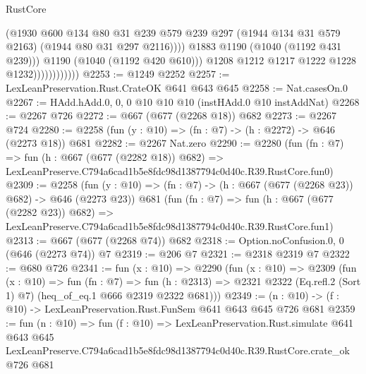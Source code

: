 \begin{lexlean}{RustCore}
\begin{coremodule}
                                    (@1930
                                      @600
                                      @134
                                      @80
                                      @31
                                      @239
                                      @579
                                      @239
                                      @297
                                      (@1944 @134 @31 @579 @2163)
                                      (@1944 @80 @31 @297 @2116))))
                                @1883
                                @1190
                                (@1040 (@1192 @431 @239)))
                              @1190
                              (@1040 (@1192 @420 @610)))
                            @1208
                            @1212
                            @1217
                            @1222
                            @1228
                            @1232))))))))))))
@2253 := @1249 @2252
@2257 := LexLeanPreservation.Rust.CrateOK @641 @643 @645
@2258 := Nat.casesOn.{0}
@2267 := HAdd.hAdd.{0, 0, 0} @10 @10 @10 (instHAdd.{0} @10 instAddNat)
@2268 := @2267 @726
@2272 := @667 (@677 (@2268 @18)) @682
@2273 := @2267 @724
@2280 := @2258 (fun (y : @10) => (fn : @7) -> (h : @2272) -> @646 (@2273 @18)) @681
@2282 := @2267 Nat.zero
@2290 := @2280
    (fun (fn : @7) =>
    fun (h : @667 (@677 (@2282 @18)) @682) =>
    LexLeanPreserve.C794a6cad1b5e8fdc98d1387794c0d40c.R39.RustCore.fun0)
@2309 := @2258
    (fun (y : @10) => (fn : @7) -> (h : @667 (@677 (@2268 @23)) @682) -> @646 (@2273 @23))
    @681
    (fun (fn : @7) =>
    fun (h : @667 (@677 (@2282 @23)) @682) =>
    LexLeanPreserve.C794a6cad1b5e8fdc98d1387794c0d40c.R39.RustCore.fun1)
@2313 := @667 (@677 (@2268 @74)) @682
@2318 := Option.noConfusion.{0, 0} (@646 (@2273 @74)) @7
@2319 := @206 @7
@2321 := @2318 @2319 @7
@2322 := @680 @726
@2341 := fun (x : @10) =>
  @2290
    (fun (x : @10) =>
    @2309
      (fun (x : @10) =>
      fun (fn : @7) =>
      fun (h : @2313) =>
      @2321 @2322 (Eq.refl.{2} (Sort 1) @7) (heq_of_eq.{1} @666 @2319 @2322 @681)))
@2349 := (n : @10) -> (f : @10) -> LexLeanPreservation.Rust.FunSem @641 @643 @645 @726 @681
@2359 := fun (n : @10) =>
  fun (f : @10) =>
  LexLeanPreservation.Rust.simulate
    @641
    @643
    @645
    LexLeanPreserve.C794a6cad1b5e8fdc98d1387794c0d40c.R39.RustCore.crate_ok
    @726
    @681
\end{coremodule}
\end{lexlean}

